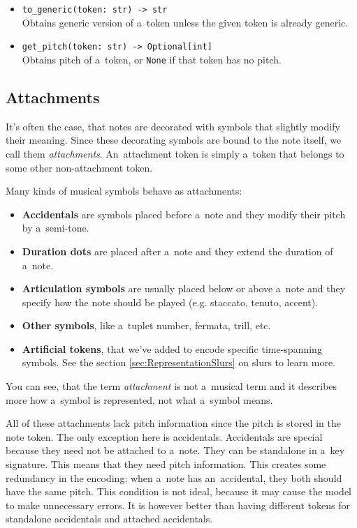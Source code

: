 \begin{itemize}
\item \verb"to_generic(token: str) -> str"\\
Obtains generic version of a~token unless the given token is already generic.
\item \verb"get_pitch(token: str) -> Optional[int]"\\
Obtains pitch of a~token, or \texttt{None} if that token has no pitch.
\end{itemize}


\subsection{Attachments}
\label{sec:Attachments}

It's often the case, that notes are decorated with symbols that slightly modify their meaning. Since these decorating symbols are bound to the note itself, we call them \emph{attachments}. An~attachment token is simply a~token that belongs to some other non-attachment token.

Many kinds of musical symbols behave as attachments:

\begin{itemize}
\item \textbf{Accidentals} are symbols placed before a~note and they modify their pitch by a~semi-tone.
\item \textbf{Duration dots} are placed after a~note and they extend the duration of a~note.
\item \textbf{Articulation symbols} are usually placed below or above a~note and they specify how the note should be played (e.g. staccato, tenuto, accent).
\item \textbf{Other symbols}, like a~tuplet number, fermata, trill, etc.
\item \textbf{Artificial tokens}, that we've added to encode specific time-spanning symbols. See the section \ref{sec:RepresentationSlurs} on slurs to learn more.
\end{itemize}

You can see, that the term \emph{attachment} is not a~musical term and it describes more how a~symbol is represented, not what a~symbol means.

All of these attachments lack pitch information since the pitch is stored in the note token. The only exception here is accidentals. Accidentals are special because they need not be attached to a~note. They can be standalone in a~key signature. This means that they need pitch information. This creates some redundancy in the encoding; when a~note has an~accidental, they both should have the same pitch. This condition is not ideal, because it may cause the model to make unnecessary errors. It is however better than having different tokens for standalone accidentals and attached accidentals.

